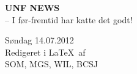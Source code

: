 \begin{minipage}[b]{0.35\linewidth}
\Huge \textbf{UNF NEWS} \\
\Large -- I før-fremtid har katte det godt!
\end{minipage}
\begin{minipage}[b]{0.4\linewidth}
\Large Søndag 14.07.2012 \\
\normalsize Redigeret i \LaTeX\ af \\ SOM, MGS, WIL, BCSJ

\end{minipage}